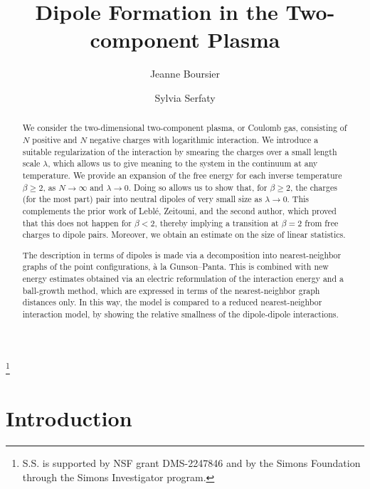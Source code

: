 \documentclass[a4paper,10pt,leqno]{amsart}
\numberwithin{equation}{section}
\begin{document}
\title[Dipoles for the 2CP]{Dipole Formation in the Two-component Plasma}
\author{Jeanne Boursier}
\address{Department of Mathematics, Massachusetts Institute of Technology, 77 Massachusetts Avenue, Cambridge, MA 02139.}
\author{Sylvia Serfaty}
\address{Courant Institute of Mathematical Sciences, 251 Mercer Street, New York, NY 10012.\\
\& Sorbonne Universit\'e, CNRS, Laboratoire Jacques-Louis Lions.}
\thanks{S.S. is supported by NSF grant DMS-2247846 and by the Simons Foundation through the Simons Investigator program.}
\begin{abstract}
  We consider the two-dimensional two-component plasma, or Coulomb gas, consisting of $N$ positive and $N$ negative charges with logarithmic interaction. We introduce a suitable regularization of the interaction by smearing the charges over a small length scale $\lambda$, which allows us to give meaning to the system in the continuum at any temperature. We provide an expansion of the free energy for each inverse temperature $\beta\ge2$, as $N \to \infty$ and $\lambda \to 0$. Doing so allows us to show that, for $\beta \geq 2$, the charges (for the most part) pair into neutral dipoles of very small size as $\lambda \to 0$. This complements the prior work of Leblé, Zeitouni, and the second author, which proved that this does not happen for $\beta < 2$, thereby implying a transition at $\beta = 2$ from free charges to dipole pairs. Moreover, we obtain an estimate on the size of linear statistics.

  The description in terms of dipoles is made via a decomposition into nearest-neighbor graphs of the point configurations, \`a la Gunson--Panta. This is combined with new energy estimates obtained via an electric reformulation of the interaction energy and a ball-growth method, which are expressed in terms of the nearest-neighbor graph distances only. In this way, the model is compared to a reduced nearest-neighbor interaction model, by showing the relative smallness of the dipole-dipole interactions.

\end{abstract}
\maketitle

\section{Introduction}
\end{document}
